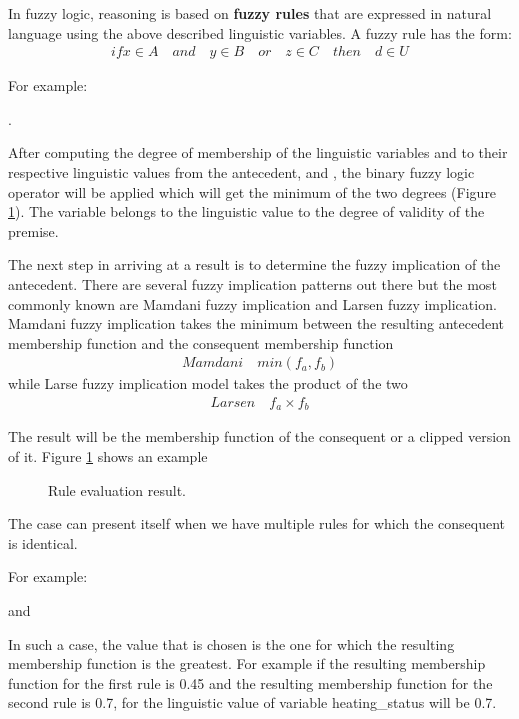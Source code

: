 \documentclass[conference]{IEEEtran}
\begin{document}
In fuzzy logic, reasoning is based on \textbf{fuzzy rules} that are expressed in natural language using the
above described linguistic variables. A fuzzy rule has the form:
\begin{align}
if x \in A \quad and \quad y \in B \quad or \quad z \in C \quad then \quad d \in U
\end{align}

For example: \par
{}.

After computing the degree of membership of the linguistic variables  and  to their
respective linguistic values from the antecedent,  and , the binary fuzzy logic operator 
will be applied which will get the minimum of the two degrees (Figure \ref{fig:rule_eval}).
The variable  belongs to the linguistic value  to the degree of validity of the
premise.

The next step in arriving at a result is to determine the fuzzy implication of the antecedent. There are
several fuzzy implication patterns out there but the most commonly known are Mamdani fuzzy implication and
Larsen fuzzy implication.
Mamdani fuzzy implication takes the minimum between the resulting antecedent membership function and the
consequent membership function
\begin{align}
Mamdani \quad min(f_{a}, f_{b})
\end{align}
while Larse fuzzy implication model takes the product of the two
\begin{align}
Larsen \quad f_{a} \times f_{b}
\end{align}

The result will be the membership function of the consequent or a clipped version of it. Figure
\ref{fig:rule_eval} shows an example
\begin{figure}[h!]
\label{fig:rule_eval}
\centerline{}
      \caption[MainModule]{Rule evaluation result.}
\label{fig:rule_eval}
\end{figure}

The case can present itself when we have multiple rules for which the consequent is identical. \par
For example: \par
{}\par
and \par
{} \par
In such a case, the value that is chosen is the one for which the resulting membership function is the
greatest. For example if the resulting membership function for the first rule is 0.45 and the resulting
membership function for the second rule is 0.7, for the linguistic value  of variable
heating\_status will be 0.7.
\end{document}
